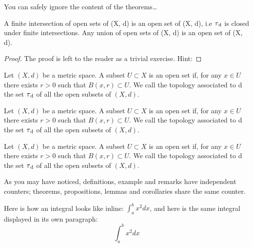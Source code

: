 You can safely ignore the content of the theorems\ldots

\begin{corollary}
A finite intersection of open sets of (X, d) is an open set of (X, d), 
i.e $\tau\textsubscript{d}$ is closed under finite intersections. Any 
union of open sets of (X, d) is an open set of (X, d).
\end{corollary}

\begin{proof}
The proof is left to the reader as a trivial exercise. Hint: \blindtext
\end{proof}

\begin{definition}
Let $(X, d)$ be a metric space. A subset $U \subset X$ is an open set 
if, for any $x \in U$ there exists $r > 0$ such that $B(x, r) \subset 
U$. We call the topology associated to d the set $\tau\textsubscript{d}$ 
of all the open subsets of $(X, d).$
\end{definition}


\begin{example}
Let $(X, d)$ be a metric space. A subset $U \subset X$ is an open set 
if, for any $x \in U$ there exists $r > 0$ such that $B(x, r) \subset 
U$. We call the topology associated to d the set $\tau\textsubscript{d}$ 
of all the open subsets of $(X, d).$
\end{example}

\begin{remark}
Let $(X, d)$ be a metric space. A subset $U \subset X$ is an open set 
if, for any $x \in U$ there exists $r > 0$ such that $B(x, r) \subset 
U$. We call the topology associated to d the set $\tau\textsubscript{d}$ 
of all the open subsets of $(X, d).$
\end{remark}

As you may have noticed, definitions, example and remarks have 
independent counters; theorems, propositions, lemmas and corollaries 
share the same counter.

\begin{remark}
Here is how an integral looks like inline: $\int_{a}^{b} x^2 dx$, and 
here is the same integral displayed in its own paragraph:
\[\int_{a}^{b} x^2 dx\]
\end{remark}


